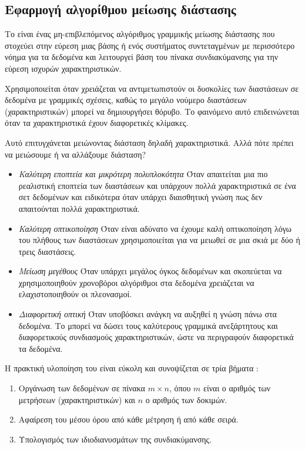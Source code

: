\subsection{Εφαρμογή αλγορίθμου μείωσης διάστασης}
Το  είναι ένας μη-επιβλεπόμενος αλγόριθμος γραμμικής μείωσης διάστασης που στοχεύει στην εύρεση μιας βάσης ή ενός συστήματος συντεταγμένων με περισσότερο νόημα για τα δεδομένα και λειτουργεί βάση του πίνακα συνδιακύμανσης για την εύρεση ισχυρών χαρακτηριστικών.\par
Χρησιμοποιείται όταν χρειάζεται να αντιμετωπιστούν οι δυσκολίες των διαστάσεων σε δεδομένα με γραμμικές σχέσεις, καθώς το μεγάλο νούμερο διαστάσεων (χαρακτηριστικών) μπορεί να δημιουργήσει θόρυβο. Το φαινόμενο αυτό επιδεινώνεται όταν τα χαρακτηριστικά έχουν διαφορετικές κλίμακες.\par
Αυτό επιτυγχάνεται μειώνοντας διάσταση δηλαδή χαρακτηριστικά. Αλλά πότε πρέπει να μειώσουμε ή να αλλάξουμε διάσταση?
\begin{itemize}
\item \emph{Καλύτερη εποπτεία και μικρότερη πολυπλοκότητα} Όταν απαιτείται μια πιο ρεαλιστική εποπτεία των διαστάσεων και υπάρχουν πολλά χαρακτηριστικά σε ένα σετ δεδομένων και ειδικότερα όταν υπάρχει διαισθητική γνώση πως δεν απαιτούνται πολλά χαρακτηριστικά.
\item \emph{Καλύτερη οπτικοποίηση}  Όταν είναι αδύνατο να έχουμε καλή οπτικοποίηση λόγω του πλήθους των διαστάσεων χρησιμοποιείται  για να μειωθεί σε μια σκιά με δύο ή τρεις διαστάσεις.
\item \emph{Μείωση μεγέθους} Όταν υπάρχει μεγάλος όγκος δεδομένων και σκοπεύεται να χρησιμοποιηθούν χρονοβόροι αλγόριθμοι στα δεδομένα χρειάζεται να ελαχιστοποιηθούν οι πλεονασμοί.
\item \emph{Διαφορετική οπτική} Όταν υποβόσκει ανάγκη να αυξηθεί η γνώση πάνω στα δεδομένα. Το  μπορεί να δώσει τους καλύτερους γραμμικά ανεξάρτητους και διαφορετικούς συνδιασμούς χαρακτηριστικών, ώστε να περιγραφούν διαφορετικά τα δεδομένα.
\end{itemize}
Η πρακτική υλοποίηση του  είναι εύκολη και συνοψίζεται σε τρία βήματα \cite{PCA}:
\begin{enumerate}
\item Οργάνωση των δεδομένων σε πίνακα $m \times n$, όπου $m$ είναι ο αριθμός των μετρήσεων (χαρακτηριστικών) και $n$ ο αριθμός των δοκιμών.
\item Αφαίρεση του μέσου όρου από κάθε μέτρηση ή από κάθε σειρά.
\item Υπολογισμός  των ιδιοδιανυσμάτων της συνδιακύμανσης.
\end{enumerate}
